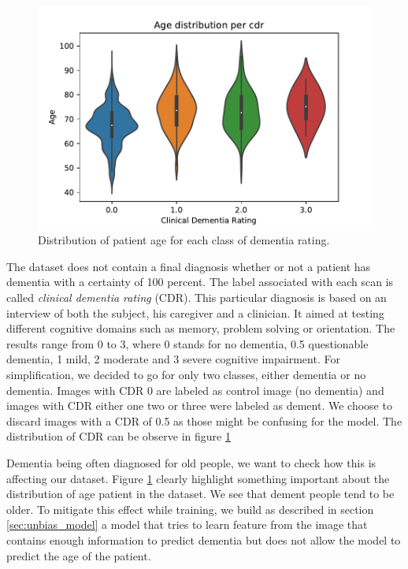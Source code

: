 \begin{figure}
 \centering
 \includegraphics[width=.9\linewidth]{figures/dataset/OASIS_age_dist_per_cdr.pdf}
 \captionsetup{width=.9\linewidth}
 \caption{Distribution of patient age for each class of dementia rating.}
 \label{fig:OASIS_age_dist}
\end{figure}

The dataset does not contain a final diagnosis whether or not a patient has dementia with a certainty of 100 percent. The label associated with each scan is called \textit{clinical dementia rating} (CDR)\footnotemark. This particular diagnosis is based on an interview of both the subject, his caregiver and a clinician. It aimed at testing different cognitive domains such as memory, problem solving or orientation. The results range from 0 to 3, where 0 stands for no dementia, 0.5 questionable dementia, 1 mild, 2 moderate and 3 severe cognitive impairment. For simplification, we decided to go for only two classes, either dementia or no dementia. Images with CDR 0 are labeled as control image (no dementia) and images with CDR either one two or three were labeled as dement. We choose to discard images with a CDR of 0.5 as those might be confusing for the model. The distribution of CDR can be observe in figure \ref{fig:OASIS_age_dist}

Dementia being often diagnosed for old people, we want to check how this is affecting our dataset. Figure \ref{fig:OASIS_age_dist} clearly highlight something important about the distribution of age patient in the dataset. We see that dement people tend to be older. To mitigate this effect while training, we build as described in section \ref{sec:unbias_model} a model that tries to learn feature from the image that contains enough information to predict dementia but does not allow the model to predict the age of the patient. 


